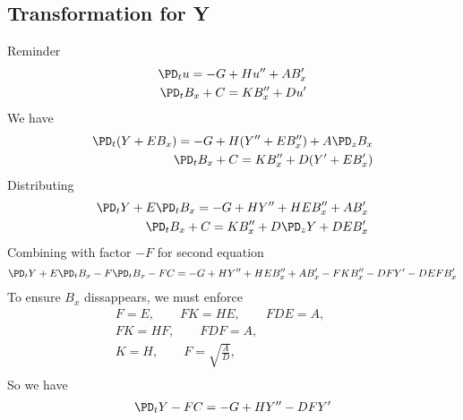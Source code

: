\documentclass[11pt]{article}
\begin{document}
\subsection{Transformation for Y}
Reminder
\begin{equation}\begin{aligned}
\PD_t u                 = -G+ H u'' + A B_x' \\
\PD_t B_x + C = K B_x'' + D u' \\
\end{aligned} \end{equation}
We have
\begin{equation}\begin{aligned}
\PD_t (Y + E B_x)        = -G+ H (Y'' + E B_x'') + A \PD_z B_x \\
\PD_t B_x + C = K B_x'' + D (Y' + E B_x') \\
\end{aligned} \end{equation}
Distributing
\begin{equation}\begin{aligned}
\PD_t Y + E \PD_t B_x = -G+ H Y'' + H E B_x'' + A B_x' \\
\PD_t B_x + C = K B_x'' + D \PD_z Y + D E B_x' \\
\end{aligned} \end{equation}
Combining with factor $-F$ for second equation
\begin{equation}\begin{aligned}
\PD_t Y + E \PD_t B_x - F \PD_t B_x - F C = -G+ H Y'' + H E B_x'' + A B_x' - F K B_x'' - D F Y' - D E F B_x'\\
\end{aligned} \end{equation}
To ensure $B_x$ dissappears, we must enforce
\begin{equation}\begin{aligned}
F = E, \qquad
FK = HE, \qquad
FDE = A, \qquad \\
FK = HF, \qquad
FDF = A, \qquad \\
K = H, \qquad
F = \sqrt{\frac{A}{D}}, \qquad \\
\end{aligned} \end{equation}
So we have
\begin{equation}\begin{aligned}
\PD_t Y - FC = -G+ H Y'' - DF Y'\\
\end{aligned} \end{equation}
\end{document}
